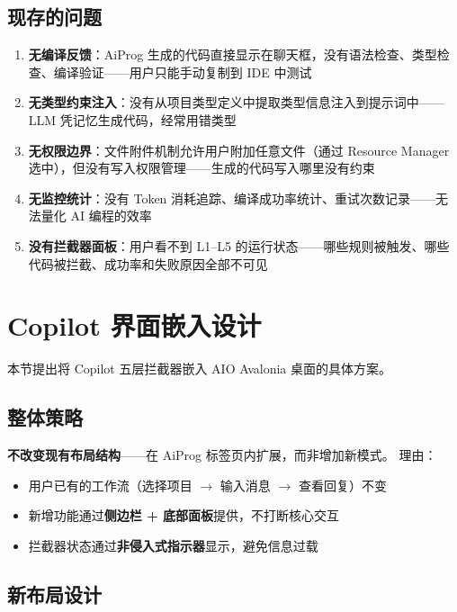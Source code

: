 \documentclass[10pt, openany]{book}
\begin{document}
\subsection{现存的问题}

\begin{enumerate}
    \item \textbf{无编译反馈}：AiProg 生成的代码直接显示在聊天框，没有语法检查、类型检查、编译验证——用户只能手动复制到 IDE 中测试
    \item \textbf{无类型约束注入}：没有从项目类型定义中提取类型信息注入到提示词中——LLM 凭记忆生成代码，经常用错类型
    \item \textbf{无权限边界}：文件附件机制允许用户附加任意文件（通过 Resource Manager 选中），但没有写入权限管理——生成的代码写入哪里没有约束
    \item \textbf{无监控统计}：没有 Token 消耗追踪、编译成功率统计、重试次数记录——无法量化 AI 编程的效率
    \item \textbf{没有拦截器面板}：用户看不到 L1--L5 的运行状态——哪些规则被触发、哪些代码被拦截、成功率和失败原因全部不可见
\end{enumerate}

\section{Copilot 界面嵌入设计}

本节提出将 Copilot 五层拦截器嵌入 AIO Avalonia 桌面的具体方案。

\subsection{整体策略}

\textbf{不改变现有布局结构}——在 AiProg 标签页内扩展，而非增加新模式。
理由：
\begin{itemize}
    \item 用户已有的工作流（选择项目 \(\to\) 输入消息 \(\to\) 查看回复）不变
    \item 新增功能通过\textbf{侧边栏 + 底部面板}提供，不打断核心交互
    \item 拦截器状态通过\textbf{非侵入式指示器}显示，避免信息过载
\end{itemize}

\subsection{新布局设计}
\end{document}
